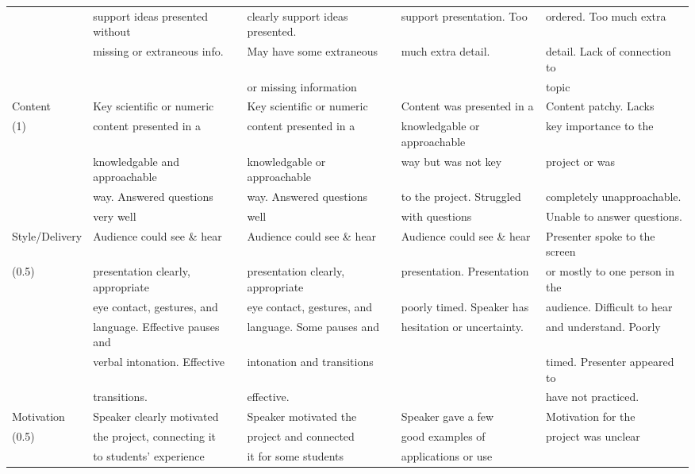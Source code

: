 \documentclass{article}
\begin{document}
\begin{tabular}{||l|l|l|l|l||}
& support ideas presented without & clearly support ideas presented. & support presentation. Too & ordered.  Too much extra \\
& missing or extraneous info. & May have some extraneous & much extra detail. & detail. Lack of connection to \\
&& or missing information && topic\\
\hline\hline
Content & Key scientific or numeric & Key scientific or numeric & Content was presented in a& Content patchy. Lacks \\
(1) & content presented in a & content presented in a & knowledgable or approachable & key importance to the\\
& knowledgable and approachable & knowledgable or approachable & way but was not key & project or was \\
& way. Answered questions & way. Answered questions & to the project. Struggled & completely unapproachable.\\
& very well & well & with questions & Unable to answer questions.\\ \hline\hline
Style/Delivery & Audience could see \& hear & Audience could see \& hear & Audience could see \& hear & Presenter spoke to the screen\\
(0.5) & presentation clearly, appropriate & presentation clearly, appropriate & presentation. Presentation & or mostly to one person in the\\
& eye contact, gestures, and & eye contact, gestures, and & poorly timed. Speaker has & audience. Difficult to hear\\
& language. Effective pauses and & language. Some pauses and & hesitation or uncertainty. & and understand. Poorly \\
& verbal intonation. Effective & intonation and transitions &&timed. Presenter appeared to\\
& transitions.  & effective. && have not practiced.\\
\hline
Motivation & Speaker clearly motivated & Speaker motivated the & Speaker gave a few & Motivation for the\\
(0.5) & the project, connecting it & project and connected & good examples of& project was unclear\\
& to students' experience & it for some students & applications or use &\\
\hline\hline
\end{tabular}
\end{document}
